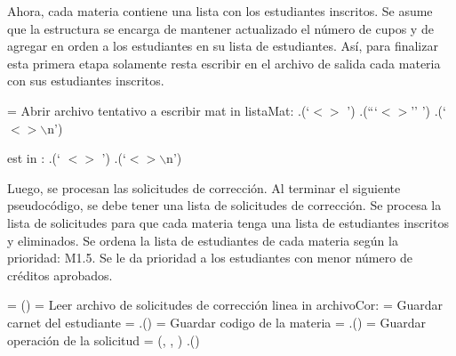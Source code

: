 \documentclass[11pt]{article}
\begin{document}
   Ahora, cada materia contiene una lista con los estudiantes inscritos. Se
   asume que la estructura se encarga de mantener actualizado el número de
   cupos y de agregar en orden a los estudiantes en su lista de estudiantes.
   Así, para finalizar esta primera etapa solamente resta escribir en el
   archivo de salida cada materia con sus estudiantes inscritos.

   \begin{codebox}
      \li {} = Abrir archivo tentativo a escribir
      \li \For mat in listaMat:
      \Do
         \li {}.(`$<$$>$ ')
         \li {}.(```$<$$>$'' ')
         \li {}.(`$<$$>\backslash$n')
         
         \li \For est in :
         \Do
            \li {}.(`   $<$$>$ ')
            \li {}.(`$<$$>\backslash$n') \label{li:Generar-Archivo-Tentativo-final}
            \End
         \End
         \End
      \End
   \end{codebox}

   Luego, se procesan las solicitudes de corrección. Al terminar el siguiente pseudocódigo, 
   se debe tener una lista de solicitudes de corrección. Se procesa la lista de solicitudes 
   para que cada materia tenga una lista de estudiantes inscritos y eliminados. Se ordena 
   la lista de estudiantes de cada materia según la prioridad: M1.5. Se le da prioridad a los 
   estudiantes con menor número de créditos aprobados. 

   \begin{codebox}
      \li {} =  ()
      \li {} = Leer archivo de solicitudes de corrección
      \li \For linea in archivoCor:
      \li \Do
          = Guardar carnet del estudiante
         \li {} = .()
         \li {} = Guardar codigo de la materia
         \li {} = .()
         \li {} = Guardar operación de la solicitud
         \li {} =  (, , )
         \li {}.() \label{li:Extraer-Datos-Correccion-final}
         \End
      \End
   \end{codebox}
\end{document}
